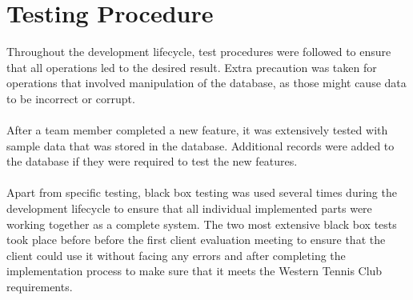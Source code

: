 \documentclass{l3proj}
\begin{document}
\section{Testing Procedure}
Throughout the development lifecycle, test procedures were followed to ensure that all operations led to the desired result. Extra precaution was taken for operations that involved manipulation of the database, as those might cause data to be incorrect or corrupt.\\
\\After a team member completed a new feature, it was extensively tested with sample data that was stored in the database. Additional records were added to the database if they were required to test the new features.\\
\\ Apart from specific testing, black box testing was used several times during the development lifecycle to ensure that all individual implemented parts were working together as a complete system. The two most extensive black box tests took place before before the first client evaluation meeting to ensure that the client could use it without facing any errors and after completing the implementation process to make sure that it meets the Western Tennis Club requirements.

\end{document}
